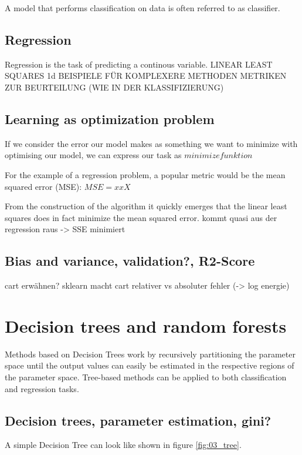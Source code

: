 A model that performs classification on data is often referred to as
classifier.

\subsection{Regression}
Regression is the task of predicting a continous variable.
LINEAR LEAST SQUARES 1d
BEISPIELE FÜR KOMPLEXERE METHODEN
METRIKEN ZUR BEURTEILUNG (WIE IN DER KLASSIFIZIERUNG)


\subsection{Learning as optimization problem}
If we consider the error our model makes %
as something we want to minimize with optimising 
our model, we can express our task as 
$minimize funktion$

For the example of a regression problem, a popular 
metric would be the mean squared error (MSE):
$MSE = xxX$

From the construction of the algorithm it quickly emerges that 
the linear least squares does in fact minimize the 
mean squared error.
kommt quasi aus der regression raus -> SSE minimiert


\subsection{Bias and variance, validation?, R2-Score}

cart erwähnen? sklearn macht cart
relativer vs absoluter fehler (-> log energie)
\section{Decision trees and random forests}
Methods based on Decision Trees work by recursively partitioning
the parameter space until the output values can easily be estimated
in the respective regions of the parameter space.
Tree-based methods can be applied to both classification and regression tasks.

\subsection{Decision trees, parameter estimation, gini?}
A simple Decision Tree can look like shown in figure \ref{fig:03_tree}.

